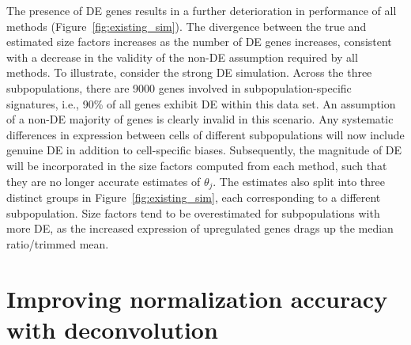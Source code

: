 \documentclass{article}
\begin{document}
The presence of DE genes results in a further deterioration in performance of all methods (Figure~\ref{fig:existing_sim}).
The divergence between the true and estimated size factors increases as the number of DE genes increases,
    consistent with a decrease in the validity of the non-DE assumption required by all methods.
To illustrate, consider the strong DE simulation.
Across the three subpopulations, there are 9000 genes involved in subpopulation-specific signatures, i.e., 90\% of all genes exhibit DE within this data set.
An assumption of a non-DE majority of genes is clearly invalid in this scenario.
Any systematic differences in expression between cells of different subpopulations will now include genuine DE in addition to cell-specific biases.
Subsequently, the magnitude of DE will be incorporated in the size factors computed from each method, such that they are no longer accurate estimates of $\theta_j$.
The estimates also split into three distinct groups in Figure~\ref{fig:existing_sim}, each corresponding to a different subpopulation.
Size factors tend to be overestimated for subpopulations with more DE, as the increased expression of upregulated genes drags up the median ratio/trimmed mean.

\section{Improving normalization accuracy with deconvolution}
\end{document}
